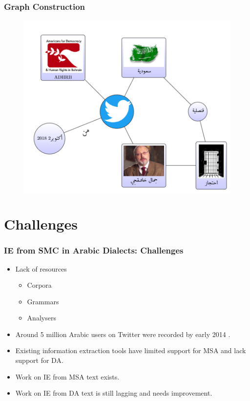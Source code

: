 \documentclass[xcolor=table]{beamer}
\begin{document}
\begin{frame}
\frametitle{Graph Construction}
\begin{figure}[!htb]
   \centering
    \includegraphics[scale=0.8]{img0011.png}
    
\end{figure}

\end{frame}

\section{Challenges}
\begin{frame}
\frametitle{IE from SMC in Arabic Dialects: Challenges}
\begin{itemize}
\item Lack of resources
\begin{itemize}
\item Corpora
\item Grammars
\item Analysers
\end{itemize}
\item Around {\color{red}5 million} Arabic users on Twitter were recorded by early 2014 \cite{twitter_social}.
\item Existing information extraction tools have limited support for MSA and lack support for DA.
\item Work on IE from MSA text exists\cite{Madamira2014, Yamama2016}.
\item Work on IE from DA text is still lagging and needs improvement\cite{Madar2018, Guidelines2018, Curras2017}.
\end{itemize}

\end{frame}
\end{document}
